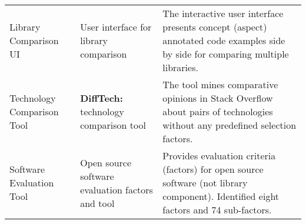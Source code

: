 \begin{table*}[]
\begin{tabular}{>{\raggedright}p{2.6cm}p{3.9cm}p{7.6cm}}
    
    
    Library Comparison UI & User interface for library comparison \cite{yan2022concept} & The interactive user interface presents concept (aspect) annotated code examples side by side for comparing multiple libraries. \\ 
    
    Technology Comparison Tool & \textbf{DiffTech:} technology comparison tool \cite{huang2018tell, wang2020difftech, wang2021difftech} & The tool mines comparative opinions in Stack Overflow about pairs of technologies without any predefined selection factors. \\ 
    
    Software Evaluation Tool & Open source software evaluation factors and tool \cite{wasserman2017osspal,
    li2022exploring} & Provides evaluation criteria (factors) for open source software (not library component). Identified eight factors and 74 sub-factors. \\ 
    
    \bottomrule
    \end{tabular}
    \label{tab:related-works-summary}
\end{table*}